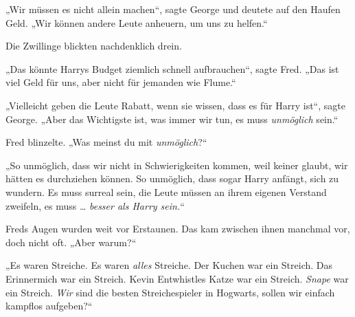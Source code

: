 „Wir müssen es nicht allein machen“, sagte George und deutete auf den Haufen Geld.
„Wir können andere Leute anheuern, um uns zu helfen.“

Die Zwillinge blickten nachdenklich drein.

„Das könnte Harrys Budget ziemlich schnell aufbrauchen“, sagte Fred.
„Das ist viel Geld für uns, aber nicht für jemanden wie Flume.“

„Vielleicht geben die Leute Rabatt, wenn sie wissen, dass es für Harry ist“, sagte George.
„Aber das Wichtigste ist, was immer wir tun, es muss \emph{unmöglich} sein.“

Fred blinzelte.
„Was meinst du mit \emph{unmöglich}?“

„So unmöglich, dass wir nicht in Schwierigkeiten kommen, weil keiner glaubt, wir hätten es durchziehen können. So unmöglich, dass sogar Harry anfängt, sich zu wundern. Es muss surreal sein, die Leute müssen an ihrem eigenen Verstand zweifeln, es muss … \emph{besser als Harry sein.}“

Freds Augen wurden weit vor Erstaunen. Das kam zwischen ihnen manchmal vor, doch nicht oft.
„Aber warum?“

„Es waren Streiche. Es waren \emph{alles} Streiche. Der Kuchen war ein Streich. Das Erinnermich war ein Streich. Kevin Entwhistles Katze war ein Streich. \emph{Snape} war ein Streich. \emph{Wir} sind die besten Streichespieler in Hogwarts, sollen wir einfach kampflos aufgeben?“

